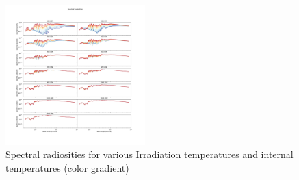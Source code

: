 \begin{figure}
    \centering
    \includegraphics[width=0.48\textwidth]{Images/spectral_radiosity.png}
    \caption{Spectral radiosities for various Irradiation temperatures and internal temperatures (color gradient)}
    \label{fig:SR}
\end{figure}